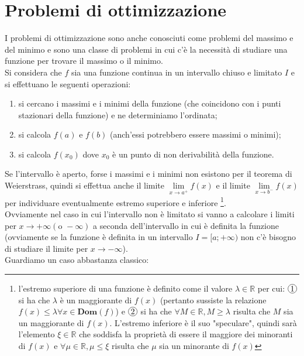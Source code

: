 \documentclass{report}
\begin{document}
\chapter{Problemi di ottimizzazione}
I problemi di ottimizzazione sono anche conosciuti come problemi del massimo e del minimo e sono una classe di problemi in cui c'è la necessità di studiare una funzione per trovare il massimo o il minimo. \\
Si considera che $f$ sia una funzione continua in un intervallo chiuso e limitato $I$ e si effettuano le seguenti operazioni:
\begin{enumerate}[label=\protect\circled{\arabic*}]
	\item si cercano i massimi e i minimi della funzione (che coincidono con i punti stazionari della funzione) e ne determiniamo l'ordinata;
	\item si calcola $f(a)$ e $f(b)$ (anch'essi potrebbero essere massimi o minimi);
	\item si calcola $f(x_0)$ dove $x_0$ è un punto di non derivabilità della funzione.
\end{enumerate}
Se l'intervallo è aperto, forse i massimi e i minimi non esistono per il teorema di Weierstrass, quindi si effettua anche il limite $\lim\limits_{x \to a^+} f(x)$ e il limite $\lim\limits_{x \to b^-} f(x)$ per individuare eventualmente estremo superiore e inferiore \footnote{l'estremo superiore di una funzione è definito come il valore $\lambda \in \mathbb{R}$ per cui: $\circled{1}$ si ha che $\lambda$ è un maggiorante di $f(x)$ (pertanto sussiste la relazione $f(x) \leq \lambda \forall x \in \mathbf{Dom}(f)$) e $\circled{2}$ si ha che $\forall M \in \mathbb{R}, M \geq \lambda$ risulta che $M$ sia un maggiorante di $f(x)$. L'estremo inferiore è il suo "speculare", quindi sarà l'elemento $\xi \in \mathbb{R}$ che soddisfa la proprietà di essere il maggiore dei minoranti di $f(x)$ e $\forall \mu \in \mathbb{R}, \mu \leq \xi$ risulta che $\mu$ sia un minorante di $f(x)$}. \\
Ovviamente nel caso in cui l'intervallo non è limitato si vanno a calcolare i limiti per $x \to +\infty (\text{o } -\infty)$ a seconda dell'intervallo in cui è definita la funzione (ovviamente se la funzione è definita in un intervallo $I = [a; +\infty)$ non c'è bisogno di studiare il limite per $x \to -\infty$). \\
Guardiamo un caso abbastanza classico:
\end{document}
